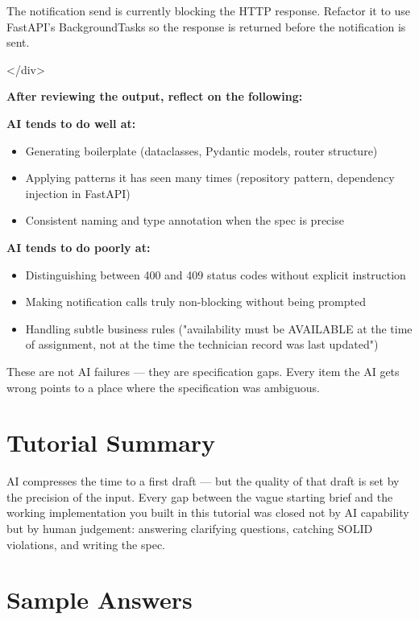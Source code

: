 \documentclass[11pt,a4paper]{book}
\begin{document}
The notification send is currently blocking the HTTP response. Refactor it to use FastAPI's BackgroundTasks so the response is returned before the notification is sent.

</div>

\textbf{After reviewing the output, reflect on the following:}

\textbf{AI tends to do well at:}
\begin{itemize}
  \item Generating boilerplate (dataclasses, Pydantic models, router structure)
  \item Applying patterns it has seen many times (repository pattern, dependency injection in FastAPI)
  \item Consistent naming and type annotation when the spec is precise
\end{itemize}

\textbf{AI tends to do poorly at:}
\begin{itemize}
  \item Distinguishing between 400 and 409 status codes without explicit instruction
  \item Making notification calls truly non-blocking without being prompted
  \item Handling subtle business rules ("availability must be AVAILABLE at the time of assignment, not at the time the technician record was last updated")
\end{itemize}

These are not AI failures --- they are specification gaps. Every item the AI gets wrong points to a place where the specification was ambiguous.

\medskip

\section{Tutorial Summary}

AI compresses the time to a first draft --- but the quality of that draft is set by the precision of the input. Every gap between the vague starting brief and the working implementation you built in this tutorial was closed not by AI capability but by human judgement: answering clarifying questions, catching SOLID violations, and writing the spec.

\medskip

\section{Sample Answers}
\end{document}
